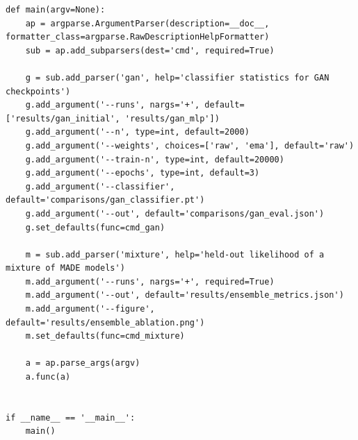 \begin{lstlisting}
def main(argv=None):
    ap = argparse.ArgumentParser(description=__doc__, formatter_class=argparse.RawDescriptionHelpFormatter)
    sub = ap.add_subparsers(dest='cmd', required=True)

    g = sub.add_parser('gan', help='classifier statistics for GAN checkpoints')
    g.add_argument('--runs', nargs='+', default=['results/gan_initial', 'results/gan_mlp'])
    g.add_argument('--n', type=int, default=2000)
    g.add_argument('--weights', choices=['raw', 'ema'], default='raw')
    g.add_argument('--train-n', type=int, default=20000)
    g.add_argument('--epochs', type=int, default=3)
    g.add_argument('--classifier', default='comparisons/gan_classifier.pt')
    g.add_argument('--out', default='comparisons/gan_eval.json')
    g.set_defaults(func=cmd_gan)

    m = sub.add_parser('mixture', help='held-out likelihood of a mixture of MADE models')
    m.add_argument('--runs', nargs='+', required=True)
    m.add_argument('--out', default='results/ensemble_metrics.json')
    m.add_argument('--figure', default='results/ensemble_ablation.png')
    m.set_defaults(func=cmd_mixture)

    a = ap.parse_args(argv)
    a.func(a)


if __name__ == '__main__':
    main()
\end{lstlisting}

